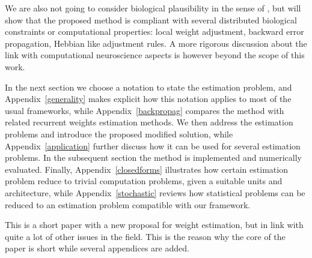 We are also not going to consider biological plausibility in the sense
of \cite{Bengio2016Towards}, but will show that the proposed method is
compliant with several distributed biological constraints or
computational properties: local weight adjustment, backward error
propagation, Hebbian like adjustment rules. A more rigorous
discussion about the link with computational neuroscience aspects is
however beyond the scope of this work.

In the next section we choose a notation to state the estimation
problem, and Appendix~\ref{generality} makes explicit how this
notation applies to most of the usual frameworks, while
Appendix~\ref{backpropag} compares the method with related recurrent
weights estimation methods. We then address the estimation problems
and introduce the proposed modified solution, while
Appendix~\ref{application} further discuss how it can be used for
several estimation problems. In the subsequent section the method is
implemented and numerically evaluated. Finally,
Appendix~\ref{closedforms} illustrates how certain estimation problem
reduce to trivial computation problems, given a suitable units and
architecture, while Appendix~\ref{stochastic} reviews how statistical
problems can be reduced to an estimation problem compatible with our
framework.

This is a short paper with a new proposal for weight estimation, but
in link with quite a lot of other issues in the field. This is the
reason why the core of the paper is short while several appendices are
added.
